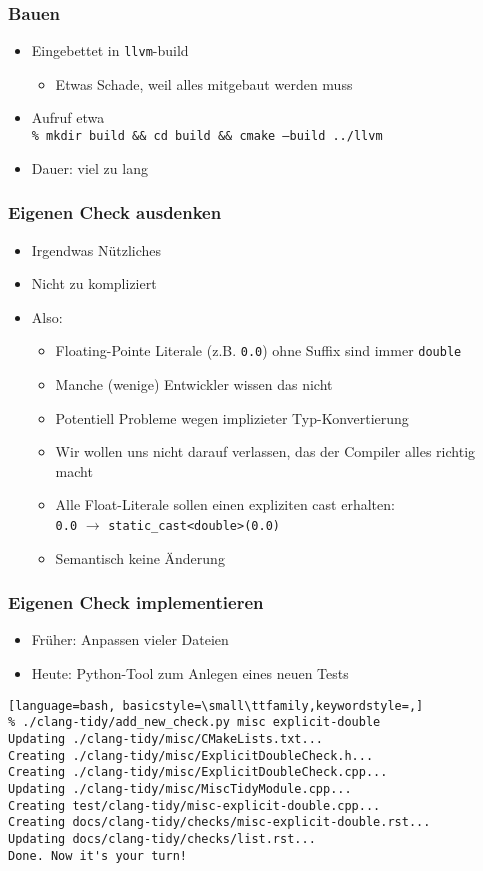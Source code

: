 \documentclass[aspectratio=169]{beamer}
\begin{document}
\begin{frame}
  \frametitle{Bauen}
  \begin{itemize}
  \item Eingebettet in \texttt{llvm}-build
    \begin{itemize}
    \item Etwas Schade, weil alles mitgebaut werden muss
    \end{itemize}
  \item Aufruf etwa\\
    \qquad \texttt{\% mkdir build \&\& cd build \&\& cmake --build ../llvm}
  \item Dauer: \pause viel zu lang
  \end{itemize}  
\end{frame}

\begin{frame}
  \frametitle{Eigenen Check ausdenken}
  \begin{itemize}
  \item Irgendwas Nützliches \pause  
  \item Nicht zu kompliziert \pause
  \item Also: \pause
    \begin{itemize}
    \item Floating-Pointe Literale (z.B. \texttt{0.0}) ohne Suffix sind immer \texttt{double}
    \item Manche (wenige) Entwickler wissen das nicht
    \item Potentiell Probleme wegen implizieter Typ-Konvertierung
    \item Wir wollen uns nicht darauf verlassen, das der Compiler alles richtig macht
    \item Alle Float-Literale sollen einen expliziten cast erhalten:\\
      \qquad \texttt{0.0} $\rightarrow$ \texttt{static\_cast<double>(0.0)}
    \item Semantisch keine Änderung
    \end{itemize}
  \end{itemize}
\end{frame}

\begin{frame}[fragile]
  \frametitle{Eigenen Check implementieren}
  \begin{itemize}
  \item Früher: Anpassen vieler Dateien \pause
  \item Heute: Python-Tool zum Anlegen eines neuen Tests
  \end{itemize}
  \begin{lstlisting}[language=bash, basicstyle=\small\ttfamily,keywordstyle=,]
% ./clang-tidy/add_new_check.py misc explicit-double
Updating ./clang-tidy/misc/CMakeLists.txt...
Creating ./clang-tidy/misc/ExplicitDoubleCheck.h...
Creating ./clang-tidy/misc/ExplicitDoubleCheck.cpp...
Updating ./clang-tidy/misc/MiscTidyModule.cpp...
Creating test/clang-tidy/misc-explicit-double.cpp...
Creating docs/clang-tidy/checks/misc-explicit-double.rst...
Updating docs/clang-tidy/checks/list.rst...
Done. Now it's your turn!    
  \end{lstlisting}
\end{frame}
\end{document}
